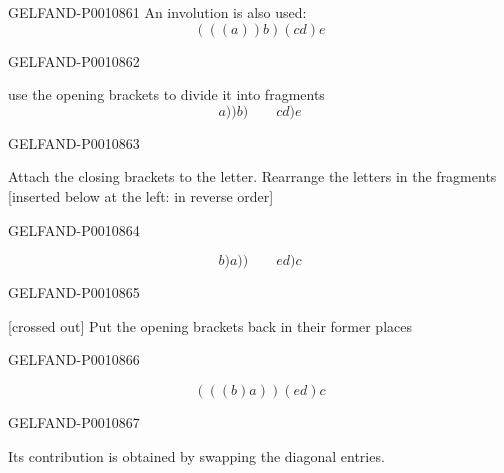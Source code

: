 \begin{GelfandAdjacentEvidence}{GELFAND-P001086}{1}
An involution is also used:
\[
(((a))b)(cd)e
\]
\end{GelfandAdjacentEvidence}
\begin{GelfandAdjacentEvidence}{GELFAND-P001086}{2}


use the opening brackets to divide it into fragments
\[
a))b)\qquad cd)e
\]
\end{GelfandAdjacentEvidence}
\begin{GelfandAdjacentEvidence}{GELFAND-P001086}{3}


Attach the closing brackets to the letter. Rearrange the letters in the fragments
[inserted below at the left: in reverse order]
\end{GelfandAdjacentEvidence}
\begin{GelfandAdjacentEvidence}{GELFAND-P001086}{4}

\[
b)a))\qquad ed)c
\]
\end{GelfandAdjacentEvidence}
\begin{GelfandAdjacentEvidence}{GELFAND-P001086}{5}


[crossed out] Put the opening brackets back in their former places
\end{GelfandAdjacentEvidence}
\begin{GelfandAdjacentEvidence}{GELFAND-P001086}{6}

\[
(((b)a))(ed)c
\]
\end{GelfandAdjacentEvidence}
\begin{GelfandAdjacentEvidence}{GELFAND-P001086}{7}



Its contribution is obtained by swapping the diagonal entries.
\end{GelfandAdjacentEvidence}



